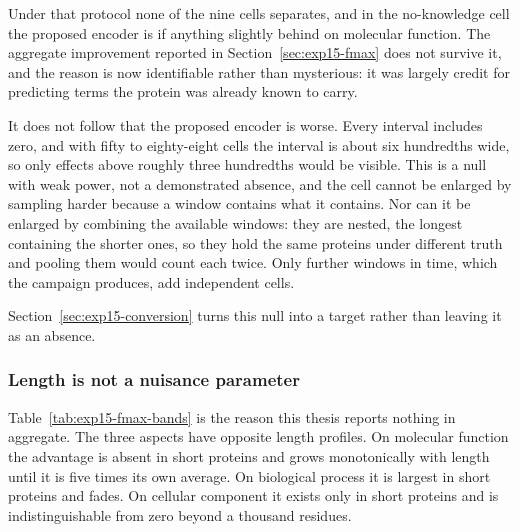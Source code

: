 \begin{table}[htbp]
  \centering
  \caption{Maximum F-measure on the window's own ground truth, by knowledge category
  and aspect, with the prior-knowledge exclusion applied. Intervals are paired
  bootstrap draws with the measure recomputed on each. No cell separates.}
  \label{tab:exp15-category}
  
\end{table}

Under that protocol none of the nine cells separates, and in the no-knowledge cell the
proposed encoder is if anything slightly behind on molecular function. The aggregate
improvement reported in Section~\ref{sec:exp15-fmax} does not survive it, and the
reason is now identifiable rather than mysterious: it was largely credit for
predicting terms the protein was already known to carry.

It does not follow that the proposed encoder is worse. Every interval includes zero,
and with fifty to eighty-eight cells the interval is about six hundredths wide, so only
effects above roughly three hundredths would be visible. This is a null with weak
power, not a demonstrated absence, and the cell cannot be enlarged by sampling harder
because a window contains what it contains. Nor can it be enlarged by combining the
available windows: they are nested, the longest containing the shorter ones, so they
hold the same proteins under different truth and pooling them would count each twice.
Only further windows in time, which the campaign produces, add independent cells.

Section~\ref{sec:exp15-conversion} turns this null into a target rather than leaving
it as an absence.

\subsubsection{Length is not a nuisance parameter}

\begin{table}[htbp]
  \centering
  \caption{Change in maximum F-measure against the deployed encoder, by protein
  length in residues. $^{*}$~the 95\,\% interval excludes zero.}
  \label{tab:exp15-fmax-bands}
  
\end{table}

Table~\ref{tab:exp15-fmax-bands} is the reason this thesis reports nothing in
aggregate. The three aspects have opposite length profiles. On molecular function the
advantage is absent in short proteins and grows monotonically with length until it is
five times its own average. On biological process it is largest in short proteins and
fades. On cellular component it exists only in short proteins and is indistinguishable
from zero beyond a thousand residues.

